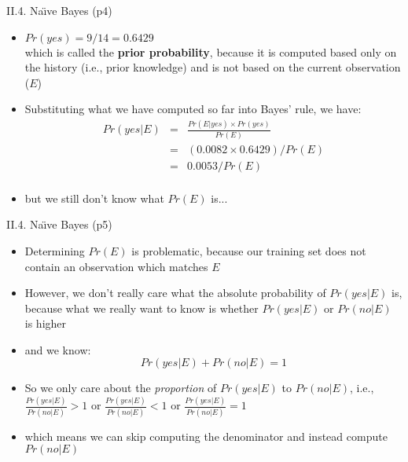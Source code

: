 \documentclass[handout]{beamer}
\newcommand{\strong}[1]{\textbf{\color{teal} #1}}
\begin{document}
\begin{frame}{II.4. Na\"{\i}ve Bayes (p4)}
\begin{itemize}
\item $Pr(yes) = 9 / 14 = 0.6429$\\
which is called the \strong{prior probability}, because it is computed based only on the history (i.e., prior knowledge) and is not based on the current observation ($E$)
\item Substituting what we have computed so far into Bayes' rule, we have:
\begin{eqnarray*}
Pr(yes|E) & = & \frac{Pr(E|yes) \times Pr(yes)}{Pr(E)} \\
          & = & ( 0.0082 \times 0.6429 ) / Pr(E) \\
          & = & 0.0053 / Pr(E)\\
\end{eqnarray*}
\item but we still don't know what $Pr(E)$ is...
\end{itemize}
\end{frame}
\begin{frame}{II.4. Na\"{\i}ve Bayes (p5)}
\begin{itemize}
\item Determining $Pr(E)$ is problematic, because our training set does not contain an observation which matches $E$
\item However, we don't really care what the absolute probability of $Pr(yes|E)$ is, because what we really want to know is whether $Pr(yes|E)$ or $Pr(no|E)$ is higher
\item and we know:
\[
Pr(yes|E) + Pr(no|E) = 1
\]
\item So we only care about the \emph{proportion} of $Pr(yes|E)$ to $Pr(no|E)$, i.e.,
$\frac{Pr(yes|E)}{Pr(no|E)} > 1$ or
$\frac{Pr(yes|E)}{Pr(no|E)} < 1$ or
$\frac{Pr(yes|E)}{Pr(no|E)} = 1$ 
\item which means we can skip computing the denominator and instead compute $Pr(no|E)$
\end{itemize}
\end{frame}
\end{document}
